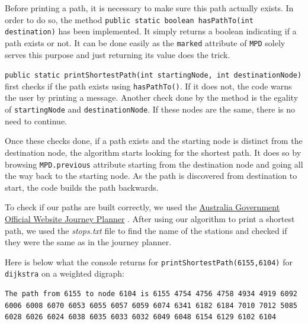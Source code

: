 \documentclass{article}
\begin{document}
Before printing a path, it is necessary to make sure this path actually exists. In order to do so, the method \texttt{public static boolean hasPathTo(int destination)} has been implemented. It simply returns a boolean indicating if a path exists or not. It can be done easily as the \texttt{marked} attribute of \texttt{MPD} solely serves this purpose and just returning its value does the trick.

\texttt{public static printShortestPath(int startingNode, int destinationNode)} first checks if the path exists using \texttt{hasPathTo()}. If it does not, the code warns the user by printing a message. Another check done by the method is the egality of \texttt{startingNode} and \texttt{destinationNode}. If these nodes are the same, there is no need to continue.

Once these checks done, if a path exists and the starting node is distinct from the destination node, the algorithm starts looking for the shortest path. It does so by browsing \texttt{MPD.previous} attribute starting from the destination node and going all the way back to the starting node. As the path is discovered from destination to start, the code builds the path backwards.

To check if our paths are built correctly, we used the \href{https://www.transport.act.gov.au/getting-around/journey-planner}{Australia Government Official Website Journey Planner} . After using our algorithm to print a shortest path, we used the \textit{stops.txt} file to find the name of the stations and checked if they were the same as in the journey planner.

\newpage
Here is below what the console returns for \texttt{printShortestPath(6155,6104)} for \texttt{dijkstra} on a weighted digraph:

\begin{verbatim}
The path from 6155 to node 6104 is 6155 4754 4756 4758 4934 4919 6092 6006 6008 6070 6053 6055 6057 6059 6074 6341 6182 6184 7010 7012 5085 6028 6026 6024 6038 6035 6033 6032 6049 6048 6154 6129 6102 6104
\end{verbatim}
\end{document}
